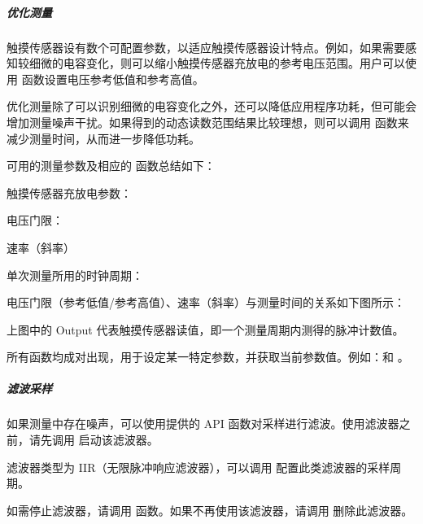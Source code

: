 \documentclass[a4paper,12pt,english]{sphinxmanual}
\begin{document}
{{\subparagraph{优化测量}
\label{\detokenize{exp-esp32/peripherals/touch:id5}}
\sphinxAtStartPar
触摸传感器设有数个可配置参数，以适应触摸传感器设计特点。例如，如果需要感知较细微的电容变化，则可以缩小触摸传感器充放电的参考电压范围。用户可以使用  函数设置电压参考低值和参考高值。

\sphinxAtStartPar
优化测量除了可以识别细微的电容变化之外，还可以降低应用程序功耗，但可能会增加测量噪声干扰。如果得到的动态读数范围结果比较理想，则可以调用  函数来减少测量时间，从而进一步降低功耗。

\sphinxAtStartPar
可用的测量参数及相应的 函数总结如下：

\sphinxAtStartPar
触摸传感器充放电参数：

\sphinxAtStartPar
电压门限：

\sphinxAtStartPar
速率（斜率）

\sphinxAtStartPar
单次测量所用的时钟周期：

\sphinxAtStartPar
电压门限（参考低值/参考高值）、速率（斜率）与测量时间的关系如下图所示：

\sphinxAtStartPar
{}

\sphinxAtStartPar
上图中的 Output 代表触摸传感器读值，即一个测量周期内测得的脉冲计数值。

\sphinxAtStartPar
所有函数均成对出现，用于设定某一特定参数，并获取当前参数值。例如：和 。


\subparagraph{滤波采样}
\label{\detokenize{exp-esp32/peripherals/touch:id6}}
\sphinxAtStartPar
如果测量中存在噪声，可以使用提供的 API 函数对采样进行滤波。使用滤波器之前，请先调用  启动该滤波器。

\sphinxAtStartPar
滤波器类型为 IIR（无限脉冲响应滤波器），可以调用  配置此类滤波器的采样周期。

\sphinxAtStartPar
如需停止滤波器，请调用  函数。如果不再使用该滤波器，请调用  删除此滤波器。


}}
\end{document}
